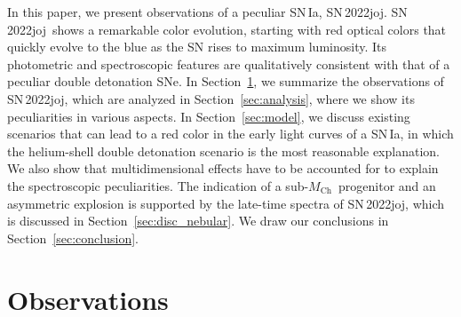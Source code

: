 \documentclass[twocolumn]{aastex631}
\newcommand{\sn}{SN\,2022joj}
\newcommand{\Mch}{$M_\mathrm{Ch}$}
\newcommand{\chang}[1]{\textcolor{blue}{[Chang: #1]}}
\begin{document}
\begin{CJK*}{UTF8}{gbsn}
In this paper, we present observations of a peculiar SN\,Ia, \sn. \sn\ shows a remarkable color evolution, starting with red optical colors that quickly evolve to the blue as the SN rises to maximum luminosity. Its photometric and spectroscopic features are qualitatively consistent with that of a peculiar double detonation SNe. In Section~\ref{sec:obs}, we summarize the observations of \sn, which are analyzed in Section~\ref{sec:analysis}, where we show its peculiarities in various aspects. In Section~\ref{sec:model}, we discuss existing scenarios that can lead to a red color in the early light curves of a SN\,Ia, in which the helium-shell double detonation scenario is the most reasonable explanation. We also show that multidimensional effects have to be accounted for to explain the spectroscopic peculiarities. 
The indication of a sub-\Mch\ progenitor and an asymmetric explosion is supported by the late-time spectra of \sn, which is discussed in Section~\ref{sec:disc_nebular}. We draw our conclusions in Section~\ref{sec:conclusion}.


\section{Observations} \label{sec:obs}

\end{CJK*}
\end{document}
